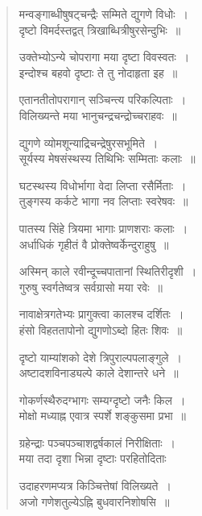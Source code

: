 \documentclass[11pt, openany]{book}
\begin{document}
\begin{quote}
{\qt मन्वङ्गाब्धीषुषट्चन्द्रैः सम्मिते द्युगणे विधोः~।\\
	दृष्टो विमर्दस्तद्वत् त्रिखाब्धित्रीषुरसेन्दुभिः~॥
	
उक्तेभ्योऽन्ये चोपरागा मया दृष्टा विवस्वतः~।\\
इन्दोश्च बहवो दृष्टाः ते तु नोदाहृता इह~॥
	
एतानतीतोपरागान् सञ्चिन्त्य परिकल्पिताः~।\\
विलिख्यन्ते मया भानुचन्द्रचन्द्रोच्चराहवः~॥
	
द्युगणे व्योमशून्याद्रिचन्द्रेषुरसभूमिते~।\\
सूर्यस्य मेषसंस्थस्य तिथिभिः सम्मिताः कलाः~॥
	
घटस्थस्य विधोर्भागा वेदा लिप्ता रसैर्मिताः~।\\
तुङ्गस्य कर्कटे भागा नव लिप्ताः स्वरेषवः~॥
	
पातस्य सिंहे त्रियमा भागाः प्राणशराः कलाः~।\\
अर्धाधिकं गृहीतं वै प्रोक्तेष्वर्केन्दुराहुषु~॥
	
अस्मिन् काले रवीन्दूच्चपातानां स्थितिरीदृशी~।\\
गुरुषु स्वर्गतेष्वत्र सर्वग्रासो मया रवेः~॥
	
नावाक्षेत्रगतेभ्यः प्रागुक्त्वा कालश्च दर्शितः~।\\
हंसो विहततापोनो द्युगणोऽब्दो हितः शिवः~॥
	
दृष्टो याम्यांशको देशे त्रिपुराल्पपलाङ्गुले~।\\
अष्टादशविनाड्यल्पे काले देशान्तरे धने~॥
	
गोकर्णस्थैरुदग्भागः सम्यग्दृष्टो जनैः किल~।\\
मोक्षो मध्याह्न एवात्र स्पर्शे शङ्कुसमा प्रभा~॥
	
ग्रहेन्द्राः पञ्चपञ्चाशद्वर्षकालं निरीक्षिताः~।\\
मया तदा दृशा भिन्ना दृष्टाः परहितोदिताः~
	
उदाहरणमप्यत्र किञ्चित्तेषां विलिख्यते~।\\
अजो गणेशतुल्येऽह्नि बुधवारनिशोषसि~॥}
\end{quote}

\newpage
\end{document}
